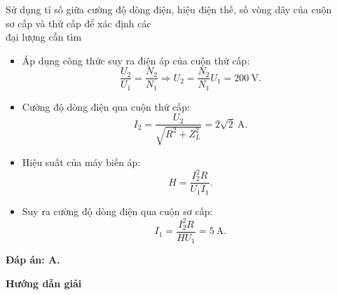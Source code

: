\begin{dang}{Sử dụng tỉ số giữa cường độ dòng điện, hiệu điện thế, số vòng dây của cuộn\\ sơ cấp và thứ cấp để xác định các\\ đại lượng cần tìm}
{		
		\begin{itemize}
			\item Áp dụng công thức suy ra điện áp của cuộn thứ cấp:
			\begin{equation*}
				\dfrac{U_2}{U_1}=\dfrac{N_2}{N_1} \Rightarrow U_2= \dfrac{N_2}{N_1}U_1 = 200\ \text{V}.
			\end{equation*}
			\item Cường độ dòng điện qua cuộn thứ cấp:
			\begin{equation*}
				I_2 = \dfrac{U_2}{\sqrt{R^2+Z_L^2}}= 2\sqrt 2\ \text{A}.
			\end{equation*}
			\item Hiệu suất của máy biến áp:
			\begin{equation*}
				H=\dfrac{I^2_2R}{U_1I_1}.
			\end{equation*}
			\item Suy ra cường độ dòng điện qua cuộn sơ cấp:
			\begin{equation*}
				I_1= \dfrac{I^2_2R}{HU_1}=5\ \text{A}.
			\end{equation*}
		\end{itemize}
		
		\textbf{Đáp án: A.}
	}
	{	\begin{center}
			\textbf{Hướng dẫn giải}
		\end{center}
		
}
\end{dang}
